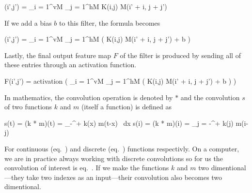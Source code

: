 \startplaceformula
\startformula
\color[red]{F}(i',j') = \sum_{i = 1}^{vM} \sum_{j = 1}^{hM} K(i,j) \cdot M(i' + i, j + j')
\stopformula
\stopplaceformula

If we add a bias $b$ to this filter, the formula becomes

\startplaceformula
\startformula
\color[red]{F}(i',j') = \sum_{i = 1}^{vM} \sum_{j = 1}^{hM} \Bigl( K(i,j) \cdot M(i' + i, j + j') + b \Bigr)
\stopformula
\stopplaceformula

Lastly, the final output feature map $F$ of the filter is produced by sending all of these entries through an activation function.

\startplaceformula
\startformula
F(i',j') = {\rm activation} \left( \sum_{i = 1}^{vM} \sum_{j = 1}^{hM} \Bigl( K(i,j) \cdot M(i' + i, j + j') + b \Bigr) \right)
\stopformula
\stopplaceformula

\startplacefigure[reference=conv-operation,
                   title={The basic forward operation of a convolutional layer},
                   location=top]
{}{}
{}{}
{}{}
{}{}
{}{}
{}{}
{}{}
{}{}
\stopcombination
\stopplacefigure

\startsubsubsection[title=Where is the convolution?]
In mathematics, the convolution operation is denoted by $*$ and the convolution $s$ of two functions $k$ and $m$ (itself a function) is defined as

\startplaceformula[reference=contconv]
\startformula
s(t) = (k * m)(t) = \int_{{-}\infty}^{{+}\infty} k(x) \cdot m(t-x) \, {\rm d}x
\stopformula
\stopplaceformula
\startplaceformula[reference=discconv]
\startformula
s(i) = (k * m)(i) = \sum_{j = {-}\infty}^{{+}\infty} k(j) \cdot m(i-j)
\stopformula
\stopplaceformula

For continuous (eq.~\in[contconv]) and discrete (eq.~\in[discconv]) functions respectivly.
On a computer, we are in practice always working with discrete convolutions so for us the convolution of interest is eq.~\in[discconv].
If we make the functions $k$ and $m$ two dimentional---they take two indexes as an input---their convolution also becomes two dimentional.

